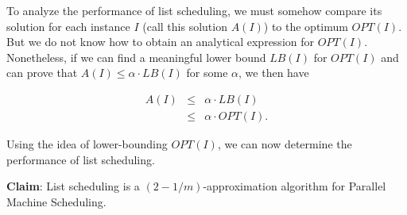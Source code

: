\documentclass{article}
\begin{document}
To analyze the performance of list scheduling, we must somehow compare its solution for each
instance $I$ (call this solution $A(I)$) to the optimum $OPT(I)$. But we do not know how to obtain
an analytical expression for $OPT(I)$. Nonetheless, if we can find a meaningful lower bound
$LB(I)$ for $OPT(I)$ and can prove that $A(I) \le \alpha \cdot LB(I)$ for some $\alpha$, we then
have

$$
\begin{array}{lcl}
A(I)    & \le & \alpha \cdot LB(I) \\
        & \le & \alpha \cdot OPT(I).
\end{array}
$$

Using the idea of lower-bounding $OPT(I)$, we can now determine the performance of list
scheduling.

\textbf{Claim}:
List scheduling is a $(2-1/m)$-approximation algorithm for Parallel Machine Scheduling.
\end{document}
